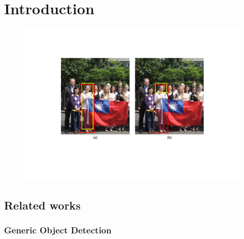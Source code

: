 \documentclass[senior]{IPSstyle}
\begin{document}
\makepreliminarypages
\singlespace
\frontmatter
\tableofcontents
\listoffigures
\listoftables
\mainmatter
\clearemptydoublepage
\setlength{\baselineskip}{23.0pt}

\chapter{Introduction} 


\begin{figure}[t]
    \begin{center}
    \includegraphics[width=0.97\linewidth]{images/start.pdf}
    \end{center}
\vspace{-0.3cm}
    \caption{ }
    \label{fintro}
    \vspace{-0.3cm}
\end{figure} 



\section{Related works}

\subsection{Generic Object Detection}




\end{document}
